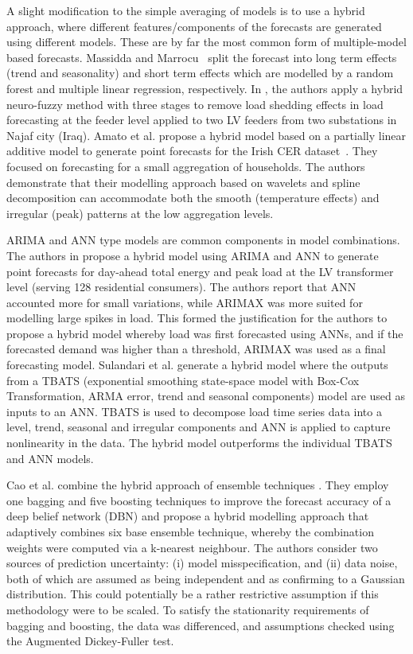 A slight modification to the simple averaging of models is to use a hybrid approach, where different features/components of the forecasts are generated using different models. These are by far the most common form of multiple-model based forecasts. Massidda and Marrocu~\cite{massidda2019smf} split the forecast into long term effects (trend and seasonality) and short term effects which are modelled by a random forest and multiple linear regression, respectively. In \cite{hashim2019anl}, the authors apply a hybrid neuro-fuzzy method with three stages to remove 
load shedding effects in load forecasting at the feeder level applied to two LV feeders from two substations in Najaf city (Iraq). %
Amato et al. \cite{Amato2021fhr} propose a hybrid model based on a partially linear additive model to generate point forecasts for the Irish CER dataset~\cite{Commission2012csm}. They focused on forecasting for a small aggregation of households. 
The authors demonstrate that their modelling approach based on wavelets and spline decomposition 
can accommodate both the smooth  (temperature effects) and irregular (peak) patterns at the low aggregation levels. 

ARIMA and ANN type models are common components in model combinations. The authors in \cite{Bennett2014flv} propose a hybrid model using ARIMA and ANN to generate point forecasts for day-ahead total energy and peak load at the LV transformer level (serving 128 residential consumers). The authors report that ANN accounted more for small variations, while ARIMAX was more suited for modelling large spikes in load. This formed the justification for the authors to propose a hybrid model whereby load was first forecasted using ANNs, and if the forecasted demand was higher than a threshold, ARIMAX was used as a final forecasting model. Sulandari et al. \cite{sulandari2016fel} generate a hybrid model where the outputs from a TBATS (exponential smoothing state-space model with Box-Cox Transformation, ARMA error, trend and seasonal components) model are used as inputs to an ANN.  TBATS is used to decompose load time series data into a level, trend, seasonal and irregular components and ANN is applied to capture nonlinearity in the data. The hybrid model outperforms the individual TBATS and ANN models.   

Cao et al. combine the hybrid approach of ensemble techniques \cite{Cao2020hed}. They employ one bagging and five boosting techniques to improve the forecast accuracy of a deep belief network (DBN) and propose a hybrid modelling approach that adaptively combines six base ensemble technique, whereby the combination weights were computed via a k-nearest neighbour. The authors consider two sources of prediction uncertainty: (i) model misspecification, and (ii) data noise, both of which are assumed as being independent and as confirming to a Gaussian distribution. This could potentially be a rather restrictive assumption if this methodology were to be scaled. To satisfy the stationarity requirements of bagging and boosting, the data was differenced, and assumptions checked using the Augmented Dickey-Fuller test.

